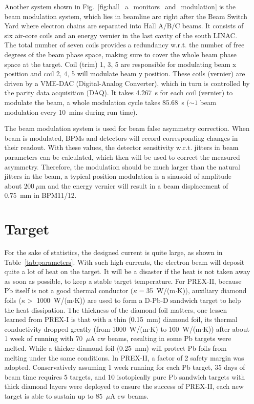 Another system shown in Fig.~\ref{fig:hall_a_monitors_and_modulation} is the
beam modulation system, which lies in beamline arc right after the Beam Switch Yard 
where electron chains are separated into Hall A/B/C beams.
It consists of six air-core coils and an energy vernier in the last cavity of the south LINAC.
The total number of seven coils provides a redundancy w.r.t. the number of free degrees 
of the beam phase space, making sure to cover the whole beam phase space at the target.  
Coil (trim) 1, 3, 5 are responsible for modulating beam x position and coil 
2, 4, 5 will modulate beam y position.
These coils (vernier) are driven by a VME-DAC (Digital-Analog Converter), 
which in turn is controlled by the parity data acquisition (DAQ).
It takes 4.267~s for each coil (vernier) to modulate the beam, a whole 
modulation cycle takes 85.68~s ($\sim 1$ beam modulation every 10~mins during
run time). 

The beam modulation system is used for beam false asymmetry correction. 
When beam is modulated, BPMs and detectors will record corresponding
changes in their readout. With these values, the detector sensitivity w.r.t. jitters 
in beam parameters can be calculated, which then will be used to correct the
measured asymmetry. Therefore, the modulation should be much larger than the natural
jitters in the beam, a typical position modulation is a sinusoid of amplitude about $200\ \mu$m 
and the energy vernier will result in a beam displacement of 0.75~mm in BPM11/12.

\section{Target}
For the sake of statistics, the designed current is quite large, as shown in
Table~\ref{tab:parameters}. With such high currents, the electron beam will deposit quite
a lot of heat on the target. It will be a disaster if the heat is not taken away 
as soon as possible, to keep a stable target temperature.
For PREX-II, because Pb itself is not a good thermal conductor ($\kappa = $35~W/(m$\cdot$K)),
auxiliary diamond foils ($\kappa >$ 1000~W/(m$\cdot$K)) are used to form a D-Pb-D 
sandwich target to help the heat dissipation. The thickness of the diamond foil matters, 
one lessen learned from PREX-I is that with a thin (0.15~mm) diamond foil, its
thermal conductivity dropped greatly (from 1000~W/(m$\cdot$K) to 100~W/(m$\cdot$K)) after about 
1 week of running with 70~$\mu$A cw beams, resulting in some Pb targets were melted. 
While a thicker diamond foil (0.25~mm) will protect Pb foils from melting 
under the same conditions. In PREX-II, a factor of 2 safety margin was adopted.
Conservatively assuming 1 week running for each Pb target, 35 days of beam time
requires 5 targets, and 10 isotopically pure Pb sandwich targets with thick 
diamond layers were deployed to ensure the success of PREX-II, each new target is able
to sustain up to 85~$\mu$A cw beams.

